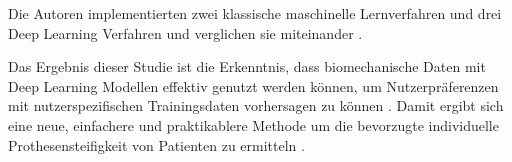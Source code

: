 Die Autoren implementierten zwei klassische maschinelle Lernverfahren und drei Deep Learning Verfahren und verglichen sie miteinander \cite{Shetty.2022}. %

Das Ergebnis dieser Studie ist die Erkenntnis, dass biomechanische Daten mit Deep Learning Modellen effektiv genutzt werden können, um Nutzerpräferenzen mit nutzerspezifischen Trainingsdaten vorhersagen zu können \cite{Shetty.2022}. Damit ergibt sich eine neue, einfachere und praktikablere Methode um die bevorzugte individuelle Prothesensteifigkeit von Patienten zu ermitteln \cite{Shetty.2022}. 